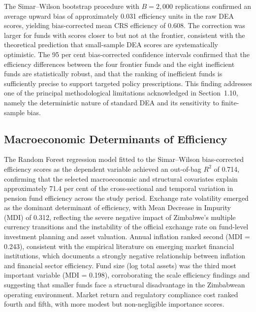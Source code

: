 \documentclass[12pt,a4paper]{article}
\begin{document}
The Simar--Wilson bootstrap procedure with $B = 2{,}000$ replications confirmed an average upward bias of approximately 0.031 efficiency units in the raw DEA scores, yielding bias-corrected mean CRS efficiency of 0.608. The correction was larger for funds with scores closer to but not at the frontier, consistent with the theoretical prediction that small-sample DEA scores are systematically optimistic. The 95 per cent bias-corrected confidence intervals confirmed that the efficiency differences between the four frontier funds and the eight inefficient funds are statistically robust, and that the ranking of inefficient funds is sufficiently precise to support targeted policy prescriptions. This finding addresses one of the principal methodological limitations acknowledged in Section~1.10, namely the deterministic nature of standard DEA and its sensitivity to finite-sample bias.

\subsection{Macroeconomic Determinants of Efficiency}

The Random Forest regression model fitted to the Simar--Wilson bias-corrected efficiency scores as the dependent variable achieved an out-of-bag $R^2$ of 0.714, confirming that the selected macroeconomic and structural covariates explain approximately 71.4 per cent of the cross-sectional and temporal variation in pension fund efficiency across the study period. Exchange rate volatility emerged as the dominant determinant of efficiency, with Mean Decrease in Impurity (MDI) of 0.312, reflecting the severe negative impact of Zimbabwe's multiple currency transitions and the instability of the official exchange rate on fund-level investment planning and asset valuation. Annual inflation ranked second (MDI = 0.243), consistent with the empirical literature on emerging market financial institutions, which documents a strongly negative relationship between inflation and financial sector efficiency. Fund size (log total assets) was the third most important variable (MDI = 0.198), corroborating the scale efficiency findings and suggesting that smaller funds face a structural disadvantage in the Zimbabwean operating environment. Market return and regulatory compliance cost ranked fourth and fifth, with more modest but non-negligible importance scores.

\end{document}
